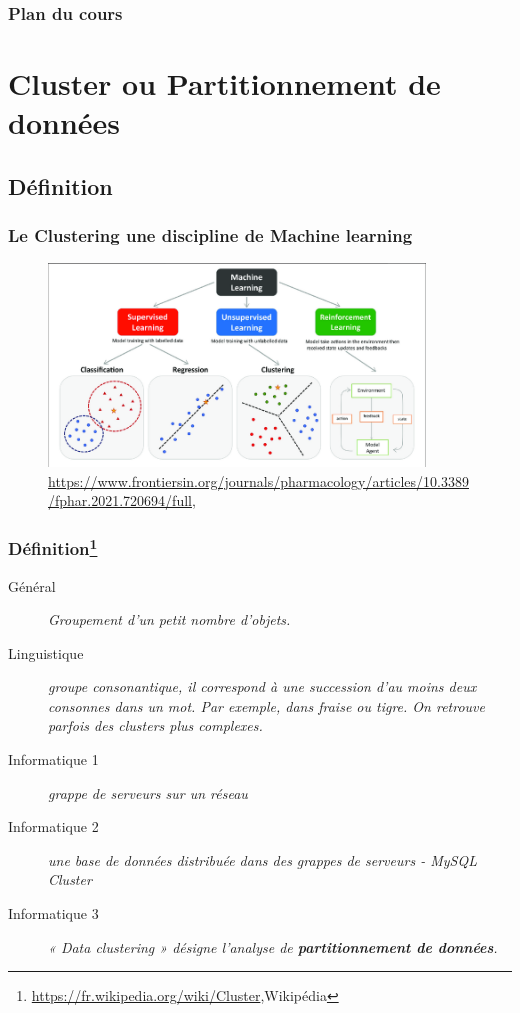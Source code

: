 \begin{frame}
  \frametitle{Plan du cours}
\tableofcontents

\end{frame}

\section{Cluster ou Partitionnement de données}
\subsection{Définition}

\begin{frame}
  \frametitle{Le Clustering une discipline de Machine learning}

 \begin{figure}
  \includegraphics[width=10cm]{images/The-main-types-of-machine-learning-Main-approaches-include-classification-and.png}
  \caption{\url{https://www.frontiersin.org/journals/pharmacology/articles/10.3389/fphar.2021.720694/full}, \cite{10.3389/fphar.2021.720694}}
  \end{figure}
\end{frame}

\begin{frame}
  \frametitle{Définition\footnote{\url{https://fr.wikipedia.org/wiki/Cluster},Wikipédia} }
   \begin{description}
  \item [Général] \textit{Groupement d'un petit nombre d'objets.}
  \item [Linguistique] \textit{groupe consonantique, il correspond à une succession d'au moins deux consonnes dans un mot. Par exemple, dans fraise ou tigre. On retrouve parfois des clusters plus complexes. }
  \item [Informatique 1]\textit{ grappe de serveurs sur un réseau}
  \item [Informatique 2] \textit{une base de données distribuée dans des grappes de serveurs - MySQL Cluster}
  \item [Informatique 3] \textit{« Data clustering » désigne l'analyse de \textbf{partitionnement de données}.}
  \end{description}


\end{frame}

